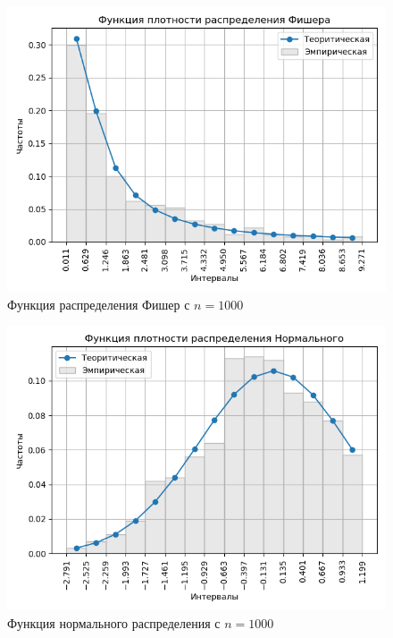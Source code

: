 \documentclass[a4]{article}
\begin{document}
\begin{center}
\begin{figure}[H]
\caption{Функция распределения Фишер с $ n = 1000$}
\includegraphics[width=\textwidth]{output/task1/fisher_1000_histogram.png}
\end{figure}

\begin{figure}[H]
\caption{Функция нормального распределения с $ n = 1000$}
\includegraphics[width=\textwidth]{output/task1/norm_1000_histogram.png}
\end{figure}


\end{center}
\end{document}
